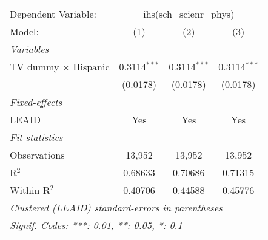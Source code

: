 \begin{tabular}{lccc}
\tabularnewline\midrule\midrule
Dependent Variable:&\multicolumn{3}{c}{ihs(sch\_scienr\_phys)}\\
Model:&(1) & (2) & (3)\\
\midrule \emph{Variables}&   &   &  \\
TV dummy $\times$ Hispanic & 0.3114$^{***}$ & 0.3114$^{***}$ & 0.3114$^{***}$\\
  &(0.0178) & (0.0178) & (0.0178)\\
\midrule \emph{Fixed-effects}&   &   &  \\
LEAID & Yes & Yes & Yes\\
\midrule \emph{Fit statistics}&  & & \\
Observations & 13,952&13,952&13,952\\
R$^2$ & 0.68633&0.70686&0.71315\\
Within R$^2$ & 0.40706&0.44588&0.45776\\
\midrule\midrule\multicolumn{4}{l}{\emph{Clustered (LEAID) standard-errors in parentheses}}\\
\multicolumn{4}{l}{\emph{Signif. Codes: ***: 0.01, **: 0.05, *: 0.1}}\\
\end{tabular}


